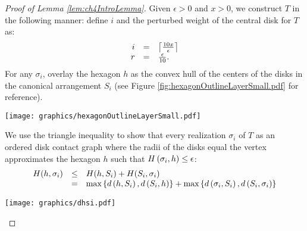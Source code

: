 \begin{proof}[Proof of Lemma \ref{lem:ch4IntroLemma}]



Given $\epsilon > 0$ and $x>0$, we construct $T$ in the following manner: define $i$ and the perturbed weight of the central disk for $T$ as:
$$
\begin{array}{rcl}
i &=& \left\lceil \frac{10x}{\epsilon} \right\rceil\\
r &=& \frac{\epsilon}{10}.
\end{array}
$$
For any $\sigma_i$, overlay the hexagon $h$ as the convex hull of the centers of the disks in the canonical arrangement $S_i$ (see Figure \ref{fig:hexagonOutlineLayerSmall.pdf} for reference).  

\begin{minipage}{\linewidth}
\begin{center}
\texttt{[image: graphics/hexagonOutlineLayerSmall.pdf]}
\label{fig:hexagonOutlineLayerSmall.pdf}
\end{center}
\end{minipage}

We use the triangle inequality to show that every realization $\sigma_i$ of $T$ as an ordered disk contact graph where the radii of the disks equal the vertex approximates the hexagon $h$ such that $H\left( \sigma_i,h \right)\leq\epsilon$:
$$\begin{array}{rcl}
H(h, \sigma_i) &\leq& H(h, S_i) + H(S_i, \sigma_i)\\
&=&\text{max} \left\lbrace d\left( h,S_i \right), d\left( S_i,h \right) \right\rbrace + \text{max} \left\lbrace d\left( \sigma_i,S_i \right), d\left( S_i,\sigma_i \right) \right\rbrace
\end{array}
$$

\begin{minipage}{\linewidth}
\begin{center}
\texttt{[image: graphics/dhsi.pdf]}
\label{fig:dhsi.pdf}
\end{center}
\end{minipage}


\end{proof}
